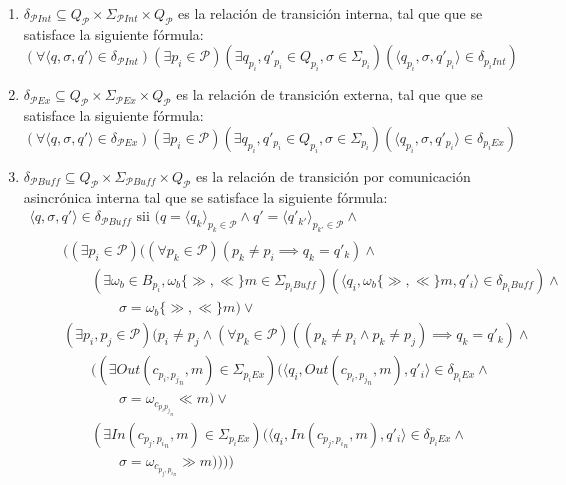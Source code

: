 \begin{definition}[Composición]
\begin{itemize}
\begin{enumerate}
\item $\delta_{\mathcal{P}\mathit{Int}} \subseteq Q_{\mathcal{P}} \times \Sigma_{\mathcal{P} Int} \times Q_{\mathcal{P}}$  es la relación de transición interna, tal que que se satisface la siguiente fórmula:
$$(\forall \langle q, \sigma, q' \rangle \in \delta_{\mathcal{P}\mathit{Int}})(\exists p_i \in \mathcal{P})(\exists q_{p_i}, q'_{p_i} \in Q_{p_i}, \sigma \in \Sigma_{p_i})(\langle q_{p_i}, \sigma, q'_{p_i} \rangle \in \delta_{p_i Int})$$

\item $\delta_{\mathcal{P}\mathit{Ex}} \subseteq Q_{\mathcal{P}} \times \Sigma_{\mathcal{P}\mathit{Ex}} \times Q_{\mathcal{P}}$ es la relación de transición externa, tal que que se satisface la siguiente fórmula: $$(\forall \langle q, \sigma, q' \rangle \in \delta_{\mathcal{P}\mathit{Ex}}) (\exists p_i \in \mathcal{P})(\exists q_{p_i},q'_{p_i} \in Q_{p_i}, \sigma \in \Sigma_{p_i}) (\langle q_{p_i},\sigma,q'_{p_i} \rangle \in \delta_{p_i Ex})$$

\item $\delta_{\mathcal{P}\mathit{Buff}} \subseteq Q_{\mathcal{P}} \times \Sigma_{\mathcal{P} \mathit{Buff}} \times Q_{\mathcal{P}}$ es la relación de transición por comunicación asincrónica interna tal que se satisface la siguiente fórmula:
$$
\begin{array}{l}
\langle q, \sigma, q' \rangle \in \delta_{\mathcal{P}\mathit{Buff}} \mbox{ sii } (q = \langle q_k \rangle_{p_k \in \mathcal{P}} \land q' = \langle q'_{k'} \rangle_{p_{k'} \in \mathcal{P}} \land\\
\qquad
\begin{array}{l}
((\exists p_i \in \mathcal{P})((\forall p_k \in \mathcal{P})(p_k \neq p_i \implies q_k = q'_k) \land \\
\qquad(\exists \omega_b \in B_{p_i}, \omega_b \{\gg, \ll\} m \in \Sigma_{{p_i} \mathit{Buff}})(\langle q_i, \omega_b \{\gg, \ll\} m, q'_i \rangle \in \delta_{p_i \mathit{Buff}}) \land\\
\qquad\qquad \sigma = \omega_b \{\gg, \ll\} m)\lor\\
(\exists p_i, p_j \in \mathcal{P})(p_i \neq p_j \land (\forall p_k \in \mathcal{P})((p_k \neq p_i \land p_k \neq p_j) \implies q_k = q'_k) \land \\ 
\qquad ((\exists \mathit{Out}(c_{{p_i, p_j}_n}, m) \in \Sigma_{{p_i} \mathit{Ex}})(\langle q_i, \mathit{Out}(c_{{p_i, p_j}_n}, m), q'_i \rangle \in \delta_{p_i  \mathit{Ex}} \land\\
\qquad\qquad \sigma = \omega_{c_{{p_i p_j}_n}} \ll m) \lor \\ 
\qquad (\exists \mathit{In}(c_{p_j,{p_i}_n}, m) \in \Sigma_{{p_i} \mathit{Ex}})(\langle q_i, \mathit{In}(c_{p_j,{p_i}_n}, m), q'_i \rangle \in \delta_{p_i \mathit{Ex}} \land\\
\qquad\qquad \sigma = \omega_{c_{p_j,{p_i}_n}} \gg m))))
\end{array}
\end{array}
 $$
 

\end{enumerate}
\end{itemize}
\end{definition}
